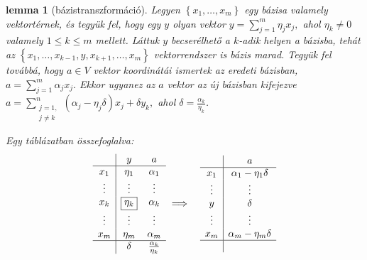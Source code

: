 \documentclass[a4paper, showtrims]{memoir}
\theoremstyle{plain}
\newtheorem{lemma}[proposition]{lemma}
\theoremstyle{remark}
\theoremstyle{definition}
\begin{document}
\begin{lemma}[bázistranszformáció]\label{le:bazistrafo}
	Legyen $\left\{ x_1,\ldots,x_m \right\}$ egy bázisa valamely vektortérnek,
	és tegyük fel,
	hogy egy $y$ olyan vektor
	\(
	y=\sum_{j=1}^m\eta_jx_j,
	\)
	ahol $\eta_k\neq 0$ valamely $1\leq k\leq m$ mellett.
	Láttuk $y$ becserélhető a $k$-adik helyen a bázisba,
	tehát az
	\(
	\left\{ x_1,\ldots,x_{k-1},y,x_{k+1},\ldots,x_m \right\}
	\)
	vektorrendszer is bázis marad.
	Tegyük fel továbbá, hogy $a\in V$ vektor koordinátái ismertek az eredeti bázisban,
	\(
	a=
	\sum_{j=1}^m\alpha_j x_j.
	\)
	Ekkor ugyanez az $a$ vektor az új bázisban kifejezve
	\(
	a=
	\sum_{\substack{j=1,\\j\neq k}}^n\left( \alpha_j-\eta_j\delta \right)x_j
	+\delta y_k,
	\)
	ahol $\delta=\frac{\alpha_k}{\eta_k}$.

	Egy táblázatban összefoglalva:
	\begin{eqnarray}\label{alg:bazistrafo}
		\begin{array}{c|cc}
			       & y              & a                       \\
			\hline
			x_1    & \eta_1         & \alpha_1                \\
			\vdots & \vdots         & \vdots                  \\
			x_k    & \boxed{\eta_k} & \alpha_k                \\
			\vdots & \vdots         & \vdots                  \\
			x_m    & \eta_m         & \alpha_m                \\
			\hline
			       & \delta         & \frac{\alpha_k}{\eta_k}
		\end{array}
		&\implies&
		\begin{array}{c|c}
			                 & a                     \\
			\hline
			x_1              & \alpha_1-\eta_1\delta \\
			\vdots           & \vdots                \\
			y                & \delta                \\
			\vdots           & \vdots                \\
			x_m              & \alpha_m-\eta_m\delta \\
			\hline
			\phantom{\delta} &
		\end{array}
	\end{eqnarray}
\end{lemma}


\end{document}
